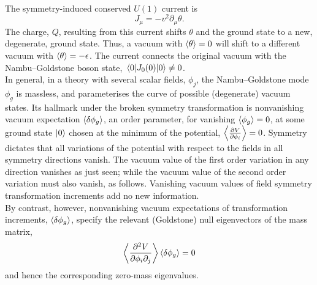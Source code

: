 \\
The symmetry-induced conserved $U(1)$ current is
\begin{equation}
J_\mu = -v^2 \partial_\mu \theta.
\end{equation}
The charge, $Q$, resulting from this current shifts $\theta$ and the ground state to a new, degenerate, ground state. Thus, a vacuum with $\expval{\theta}=0$ will shift to a different vacuum with $\expval{\theta}=-\epsilon$. The current connects the original vacuum with the Nambu–Goldstone boson state, $\expval{J_0(0)}{0} \neq 0$.\\
In general, in a theory with several scalar fields, $\phi_j$, the Nambu–Goldstone mode $\phi_g$ is massless, and parameterises the curve of possible (degenerate) vacuum states. Its hallmark under the broken symmetry transformation is nonvanishing vacuum expectation $\expval{\delta \phi_g}$, an order parameter, for vanishing $\expval{\phi_g}=0$, at some ground state $\ket{0}$ chosen at the minimum of the potential, $\expval{\frac{\partial V}{\partial \phi_i}}=0$. Symmetry dictates that all variations of the potential with respect to the fields in all symmetry directions vanish. The vacuum value of the first order variation in any direction vanishes as just seen; while the vacuum value of the second order variation must also vanish, as follows. Vanishing vacuum values of field symmetry transformation increments add no new information.\\
By contrast, however, nonvanishing vacuum expectations of transformation increments, $\expval{\delta \phi_g}$, specify the relevant (Goldstone) null eigenvectors of the mass matrix,
\begin{equation}
\expval{\frac{\partial^2 V}{\partial \phi_i \partial_j}} \expval{\delta \phi_g} =0
\end{equation}
and hence the corresponding zero-mass eigenvalues.
